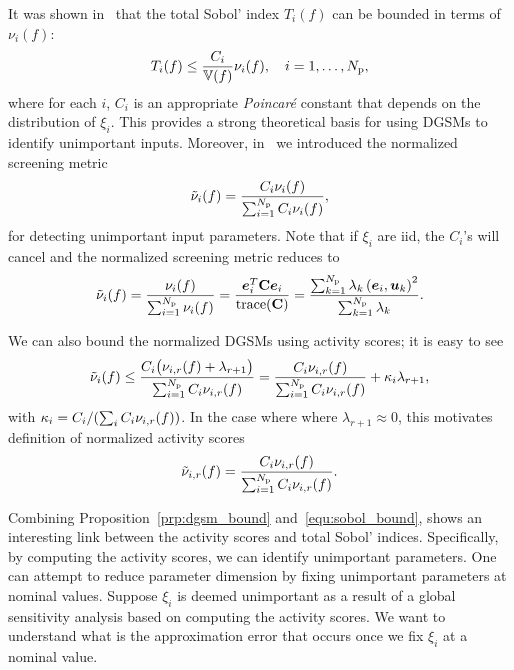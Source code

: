 It was shown in~\cite{Lamboni:2013} that the total Sobol' 
index $T_i(f)$ can be bounded in terms of $\nu_i(f)$:
\begin{equation}\label{equ:sobol_bound}
T_i(f) \leq \frac{C_i}{\V(f)}\nu_i(f), \quad i = 1, \ldots, \Np,
\end{equation}
where for each $i$, $C_i$ is an appropriate \emph{Poincar\'{e}} constant
that depends on the distribution of $\xi_i$.
This provides a strong theoretical basis for using DGSMs to identify 
unimportant inputs. Moreover, 
in~\cite{Vohra:2018} we introduced the normalized screening metric
\[
   \tilde{\nu}_i(f) = \frac{C_i \nu_i(f)}{\sum_{i=1}^\Np C_i \nu_i(f)},
\]
for detecting unimportant input parameters. 
Note that if $\xi_i$ are iid, the $C_i$'s will cancel and the normalized screening
metric reduces to 
\[
    \tilde{\nu}_i(f) = \frac{\nu_i(f)}{\sum_{i=1}^\Np \nu_i(f)} 
      = \frac{\vec{e}_i^T \mat{C} \vec{e}_i}{\trace(\mat{C})} 
      = \frac{\sum_{k=1}^\Np \lambda_k \ip{\vec{e}_i}{\vec{u}_k}^2}{\sum_{k = 1}^\Np \lambda_k}.
\]

We can also bound the normalized DGSMs using activity scores; it is easy to see  
\[
\tilde{\nu}_i(f) \leq 
\frac{ C_i \big(\act{f}{i}{r} + \lambda_{r+1}\big)}{\sum_{i=1}^\Np C_i \act{f}{i}{r}}
=\frac{C_i \act{f}{i}{r}}{\sum_{i=1}^\Np C_i \act{f}{i}{r}} + \kappa_i \lambda_{r+1}, 
\]
with $\kappa_i = C_i / (\sum_i C_i \act{f}{i}{r})$. 
In the case where where $\lambda_{r+1} \approx 0$, 
this motivates definition of
normalized activity scores
\[
   \actt{f}{i}{r} =  \frac{C_i \act{f}{i}{r}}{\sum_{i=1}^\Np C_i \act{f}{i}{r}}.
\] 

Combining Proposition~\ref{prp:dgsm_bound} and~\eqref{equ:sobol_bound}, shows
an interesting link between the activity scores and total Sobol' indices.
Specifically, by computing the activity scores, we can identify unimportant
parameters.  
One can attempt to reduce parameter dimension by fixing
unimportant parameters at nominal values. Suppose $\xi_i$ is
deemed unimportant as a result of a global sensitivity analysis
based on computing the activity scores. We want to understand
what is the approximation error that occurs once we fix $\xi_i$ 
at a nominal value.

